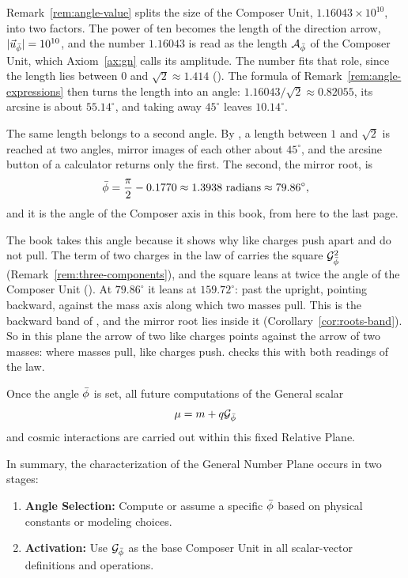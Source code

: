 \begin{plainwords}
Remark~\ref{rem:angle-value} splits the size of the Composer Unit, $1.16043 \times 10^{10}$, into two factors. The power of ten becomes the length of the direction arrow, $|\vec{u}_{\bar{\phi}}| = 10^{10}$, and the number $1.16043$ is read as the length $\mathcal{A}_{\bar{\phi}}$ of the Composer Unit, which Axiom~\ref{ax:gn} calls its amplitude. The number fits that role, since the length lies between $0$ and $\sqrt{2} \approx 1.414$ (). The formula of Remark~\ref{rem:angle-expressions} then turns the length into an angle: $1.16043/\sqrt{2} \approx 0.82055$, its arcsine is about $55.14^\circ$, and taking away $45^\circ$ leaves $10.14^\circ$.
\end{plainwords}

The same length belongs to a second angle. By , a length between $1$ and $\sqrt{2}$ is reached at two angles, mirror images of each other about $45^\circ$, and the arcsine button of a calculator returns only the first. The second, the mirror root, is
\[
\bar{\phi} = \frac{\pi}{2} - 0.1770 \approx 1.3938 \text{ radians} \approx 79.86^\circ ,
\]
and it is the angle of the Composer axis in this book, from here to the last page.

The book takes this angle because it shows why like charges push apart and do not pull. The term of two charges in the law of  carries the square $\mathcal{G}_{\bar{\phi}}^2$ (Remark~\ref{rem:three-components}), and the square leans at twice the angle of the Composer Unit (). At $79.86^\circ$ it leans at $159.72^\circ$: past the upright, pointing backward, against the mass axis along which two masses pull. This is the backward band of , and the mirror root lies inside it (Corollary~\ref{cor:roots-band}). So in this plane the arrow of two like charges points against the arrow of two masses: where masses pull, like charges push.  checks this with both readings of the law.

Once the angle $\bar{\phi}$ is set, all future computations of the General scalar
\[
\mu = m + q\mathcal{G}_{\bar{\phi}}
\]
and cosmic interactions are carried out within this fixed Relative Plane.

In summary, the characterization of the General Number Plane occurs in two stages:
\begin{enumerate}
  \item \textbf{Angle Selection:} Compute or assume a specific $\bar{\phi}$ based on physical constants or modeling choices.
  \item \textbf{Activation:} Use $\mathcal{G}_{\bar{\phi}}$ as the base Composer Unit in all scalar-vector definitions and operations.
\end{enumerate}

